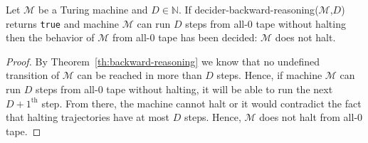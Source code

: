 \begin{corollary}\normalfont
  Let $\mathcal{M}$ be a Turing machine and $D\in\mathbb{N}$. If {\sc decider-backward-reasoning}($\mathcal{M}$,$D$) returns \texttt{true} and machine $\mathcal{M}$ can run $D$ steps from all-0 tape without halting then the behavior of $\mathcal{M}$ from all-0 tape has been decided: $\mathcal{M}$ does not halt.
\end{corollary}
\begin{proof}
By Theorem~\ref{th:backward-reasoning} we know that no undefined transition of $\mathcal{M}$ can be reached in more than $D$ steps. Hence, if machine $\mathcal{M}$ can run $D$ steps from all-0 tape without halting, it will be able to run the next $D+1^{\text{th}}$ step. From there, the machine cannot halt or it would contradict the fact that halting trajectories have at most $D$ steps. Hence, $\mathcal{M}$ does not halt from all-0 tape.
\end{proof}

